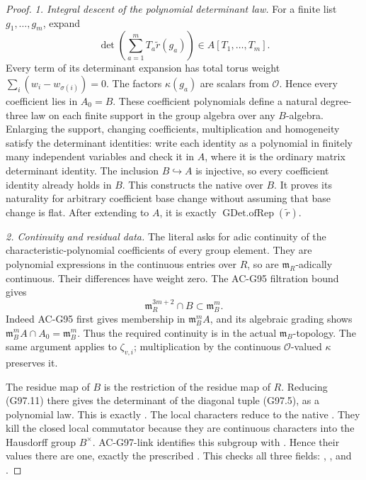 \begin{proof}
\emph{1. Integral descent of the polynomial determinant law.}
For a finite list \(g_1,\ldots,g_m\), expand
\[
 \det\left(\sum_{a=1}^m T_a\widetilde r(g_a)\right)
                         \in A[T_1,\ldots,T_m].
 \tag{G97.11}
\]
Every term of its determinant expansion has total torus
weight \(\sum_i(w_i-w_{\sigma(i)})=0\).
The factors \(\kappa(g_a)\) are scalars from
\(\mathcal O\).  Hence every coefficient lies in
\(A_0=B\).  These coefficient polynomials define a
natural degree-three law on each finite support in the
group algebra over any \(B\)-algebra.  Enlarging the
support, changing coefficients, multiplication and
homogeneity satisfy the determinant identities:
write each identity as a polynomial in finitely many
independent variables and check it in \(A\), where it
is the ordinary matrix determinant identity.
The inclusion \(B\hookrightarrow A\) is injective,
so every coefficient identity already holds in \(B\).
This constructs the native  over \(B\).
It proves its naturality for arbitrary coefficient
base change without assuming that base change is flat.
After extending to \(A\), it is exactly
\(\operatorname{GDet.ofRep}(\widetilde r)\).

\emph{2. Continuity and residual data.}
The literal  asks for adic continuity
of the characteristic-polynomial coefficients of every
group element.  They are polynomial expressions in
the continuous entries over \(R\), so are
\(\mathfrak m_R\)-adically continuous.  Their differences
have weight zero.  The AC-G95 filtration bound gives
\[
 \mathfrak m_R^{3m+2}\cap B\subset\mathfrak m_B^m.
 \tag{G97.12}
\]
Indeed AC-G95 first gives membership in
\(\mathfrak m_B^m A\), and its algebraic grading shows
\(\mathfrak m_B^m A\cap A_0=\mathfrak m_B^m\).
Thus the required continuity is in the actual
\(\mathfrak m_B\)-topology.  The same argument applies
to \(\zeta_{v,i}\); multiplication by the continuous
\(\mathcal O\)-valued \(\kappa\) preserves it.

The residue map of \(B\) is the restriction of the
residue map of \(R\).  Reducing (G97.11) there gives
the determinant of the diagonal tuple (G97.5), as a
polynomial law.  This is exactly .
The local characters reduce to the native .
They kill the closed local commutator because they
are continuous characters into the Hausdorff group
\(B^\times\).  AC-G97-link identifies this subgroup
with .  Hence their values there are one,
exactly the prescribed .  This checks all
three  fields: , ,
and .


\end{proof}
